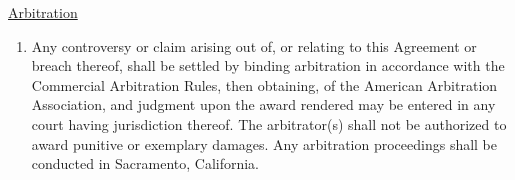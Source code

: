 \underline{Arbitration}
\begin{enumerate}[
    ref = \SecondLevelEnumerator
]
    \item Any controversy or claim arising out of, or relating to this
    Agreement or breach thereof, shall be settled by binding arbitration in
    accordance with the Commercial Arbitration Rules, then obtaining, of
    the American Arbitration Association, and judgment upon the award
    rendered may be entered in any court having jurisdiction thereof. The
    arbitrator(s) shall not be authorized to award punitive or exemplary
    damages. Any arbitration proceedings shall be conducted in Sacramento,
    California.
\end{enumerate}